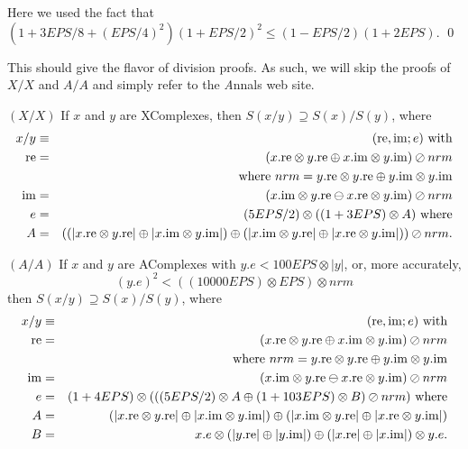 Here we used the fact that 
\hfill $(1 + 3EPS/8 + (EPS/4)^2)(1+EPS/2)^2 \le (1 - EPS/2)(1+ 2EPS).$ \hfill\qed
{}
 
This should give the flavor of division proofs.  As such, we will skip the proofs of $X/X$ and $A/A$ and simply refer to the
 {\textit Annals} web site.
\begin{proposition}\label{GMT prop7.12}{$(X / X)$}
If $x$ and $y$ are {\textrm XComplexes,} then
$S(x / y) \supseteq S(x) / S(y)${\textrm ,} where
\begin{eqnarray*}
x  / y  &\equiv& (\mathrm {re},\mathrm {im};e)\hbox{ with}\\
\mathrm {re}& =& (x.\mathrm {re} \otimes y.\mathrm {re} \oplus x.\mathrm {im} \otimes y.\mathrm {im}) \oslash nrm\\
&&\hbox{ where $nrm = y.\mathrm {re}
\otimes y.\mathrm {re} \oplus y.\mathrm {im} \otimes y.\mathrm {im}$}\\
\mathrm {im}& = &(x.\mathrm {im} \otimes y.\mathrm {re} \ominus x.\mathrm {re} \otimes y.\mathrm {im}) \oslash nrm\\
e& =& (5EPS/2) \otimes ((1
+  3EPS) \otimes A) \hbox{  where}\\
 A& =& 
((|x.\mathrm {re} \otimes y.\mathrm {re}| \oplus |x.\mathrm {im} \otimes y.\mathrm {im}|)
 \oplus 
 (|x.\mathrm {im} \otimes y.\mathrm {re}| \oplus |x.\mathrm {re} \otimes y.\mathrm {im}|))
\oslash nrm
.\end{eqnarray*}
\end{proposition}

\begin{proposition}\label{GMT prop7.13}{$(A / A)$}
If $x$ and $y$ are {\textrm AComplexes} with 
$y.e < 100 EPS \otimes |y|${\textrm ,} or{\textrm ,} more accurately{\textrm ,}
$$(y.e)^2< ((10000 EPS) \otimes EPS)\otimes nrm$$ then
$S(x / y) \supseteq S(x) / S(y)${\textrm ,} where
\begin{eqnarray*}
x  / y & \equiv& (\mathrm {re},\mathrm {im};e)\hbox{ with}\\
\mathrm {re}& =& (x.\mathrm {re} \otimes y.\mathrm {re} \oplus x.\mathrm {im} \otimes y.\mathrm {im}) \oslash nrm\\
&&\hbox{ where $nrm = y.\mathrm {re}
\otimes y.\mathrm {re} \oplus y.\mathrm {im} \otimes y.\mathrm {im}$}\\
\mathrm {im}& =& (x.\mathrm {im} \otimes y.\mathrm {re} \ominus x.\mathrm {re} \otimes y.\mathrm {im}) \oslash nrm\\
e& =& (1 + 4EPS)\otimes 
(
((5 EPS/2) \otimes A \oplus (1+103EPS) \otimes B)
\oslash nrm)\hbox{ where}\\
 A& =& (|x.\mathrm {re} \otimes y.\mathrm {re}| \oplus |x.\mathrm {im}\otimes y.\mathrm {im}|) 
 \oplus
(|x.\mathrm {im} \otimes y.\mathrm {re}| \oplus | x.\mathrm {re} \otimes y.\mathrm {im}|)\\
B& =& x.e\otimes(|y.\mathrm {re}|\oplus|y.\mathrm {im}|)
\oplus
   (|x.\mathrm {re}|\oplus|x.\mathrm {im}|)\otimes y.e.
\end{eqnarray*}
\end{proposition}

